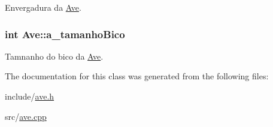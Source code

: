 Envergadura da \hyperlink{classAve}{Ave}. 

\subsubsection[{\texorpdfstring{a\+\_\+tamanho\+Bico}{a_tamanhoBico}}]{\setlength{\rightskip}{0pt plus 5cm}int Ave\+::a\+\_\+tamanho\+Bico\hspace{0.3cm}{\ttfamily [protected]}}\hypertarget{classAve_a4f544837b737e0a7984843033531f59f}{}\label{classAve_a4f544837b737e0a7984843033531f59f}


Tamnanho do bico da \hyperlink{classAve}{Ave}. 



The documentation for this class was generated from the following files\+:\begin{DoxyCompactItemize}
\item 
include/\hyperlink{ave_8h}{ave.\+h}\item 
src/\hyperlink{ave_8cpp}{ave.\+cpp}\end{DoxyCompactItemize}
